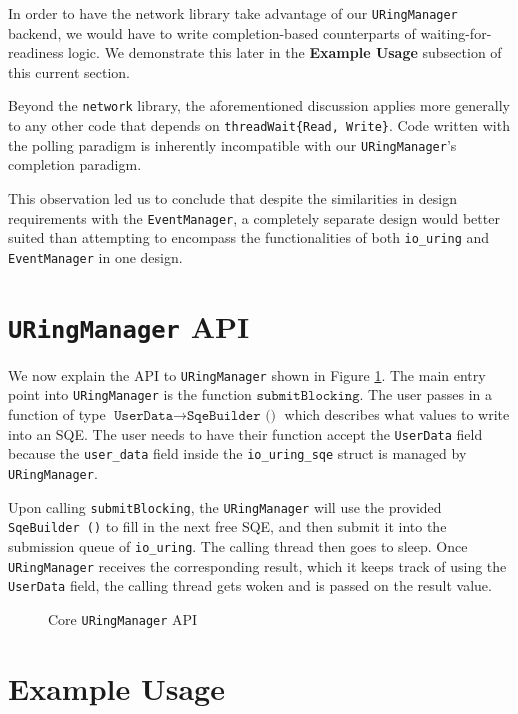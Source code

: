 In order to have the network library take advantage of our \texttt{URingManager} backend,
we would have to write
completion-based counterparts of waiting-for-readiness logic.
We demonstrate this later in the \textbf{Example Usage} subsection of this current section.

Beyond the \texttt{network} library, the aforementioned discussion applies
more generally to any other code that depends on
\texttt{threadWait\{Read, Write\}}. Code written with the polling
paradigm is inherently incompatible with our \texttt{URingManager}’s completion paradigm.

This observation led us to conclude that despite the similarities in
design requirements with the \texttt{EventManager}, a completely separate design would
better suited than attempting to encompass the functionalities of
both \texttt{io\_uring} and \texttt{EventManager} in one design.

\section{\texttt{URingManager} API}

We now explain the API to \texttt{URingManager} shown in
Figure \ref{fig:uringManagerAPI}.
The main entry point into \texttt{URingManager} is the
function $\texttt{submitBlocking}$. The user passes in
a function of type $\texttt{UserData} \to \texttt{SqeBuilder ()}$
which describes what values to write into an SQE. The user needs
to have their function accept the \texttt{UserData} field
because the \texttt{user\_data} field inside
the \texttt{io\_uring\_sqe} struct is managed by \texttt{URingManager}.

Upon calling \texttt{submitBlocking}, the \texttt{URingManager}
will use the provided \newline \texttt{SqeBuilder ()} to fill in the next
free SQE, and then submit it into the submission queue of
\texttt{io\_uring}. The calling thread then goes to sleep.
Once \texttt{URingManager} receives the corresponding
result, which it keeps track of using the \texttt{UserData} field,
the calling thread gets woken and is passed on the result value.

\begin{figure}[ht]
    \centering
	
	\caption[\texttt{URingManager} API]{Core \texttt{URingManager} API}
	\label{fig:uringManagerAPI}
\end{figure} 


\section{Example Usage}

